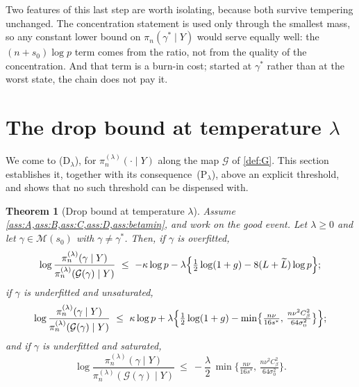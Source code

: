 \documentclass[aos]{imsart}
\newcommand{\Ltil}{\widetilde{L}}
\newcommand{\gainfloorsm}{%
    \min\bigl\{\tfrac{n\nu}{16s^{\ast}},\,
    \tfrac{n\nu^{2}C_\beta^{2}}{64\sigma_0^{2}}\bigr\}}
\theoremstyle{plain}
\newtheorem{theorem}{Theorem}[section]
\theoremstyle{definition}
\begin{document}
    Two features of this last step are worth isolating, because both survive
    tempering unchanged. The concentration statement is used only through
    the smallest mass, so any constant lower bound on
    $\pi_n(\gamma^{\ast}\mid Y)$ would serve equally well: the
    $(n+s_0)\log p$ term comes from the ratio, not from the quality of the
    concentration. And that term is a burn-in cost; started at
    $\gamma^{\ast}$ rather than at the worst state, the chain does not pay
    it.




    \section{The drop bound at temperature $\lambda$}
    \label{sec:main}

    We come to (D$_\lambda$), for $\pi_n^{(\lambda)}(\cdot\mid Y)$ along the
    map $\mathcal{G}$ of \cref{def:G}. This section establishes it, together
    with its consequence~(P$_\lambda$), above an explicit threshold, and
    shows that no such threshold can be dispensed with.

    \begin{theorem}[Drop bound at temperature $\lambda$]
        \label{th:drop}
        Assume \cref{ass:A,ass:B,ass:C,ass:D,ass:betamin},
        and work on the good event. Let $\lambda\geq0$ and let
        $\gamma\in\mathscr{M}(s_0)$ with $\gamma\neq\gamma^{\ast}$. Then, if $\gamma$ is overfitted,
        \begin{equation}
            \label{eq:drop_over}
            \log\frac{\pi_n^{(\lambda)}(\gamma\mid Y)}
            {\pi_n^{(\lambda)}(\mathcal{G}(\gamma)\mid Y)}
            \ \leq\ -\kappa\log p
            -\lambda\Bigl\{\tfrac12\log(1+g)-8(L+\Ltil)\log p\Bigr\} ;
        \end{equation}
        if $\gamma$ is underfitted and unsaturated,
        \begin{equation}
            \label{eq:drop_unsat}
            \log\frac{\pi_n^{(\lambda)}(\gamma\mid Y)}
            {\pi_n^{(\lambda)}(\mathcal{G}(\gamma)\mid Y)}
            \ \leq\ \kappa\log p
            +\lambda\Bigl\{\tfrac12\log(1+g)-\gainfloorsm\Bigr\} ;
        \end{equation}
        and if $\gamma$ is underfitted and saturated,
        \begin{equation}
            \label{eq:drop_sat}
            \log\frac{\pi_n^{(\lambda)}(\gamma\mid Y)}
            {\pi_n^{(\lambda)}(\mathcal{G}(\gamma)\mid Y)}
            \ \leq\ -\frac{\lambda}{2}\,\gainfloorsm .
        \end{equation}
    \end{theorem}
\end{document}
